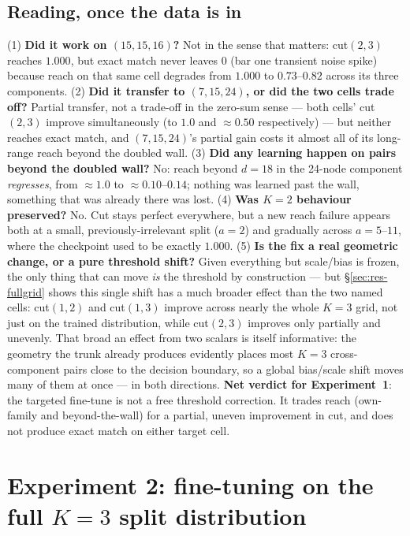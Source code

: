 \documentclass[11pt,a4paper]{article}
\begin{document}
\subsection{Reading, once the data is in}
\label{sec:verdict-a}

(1) \textbf{Did it work on $(15,15,16)$?} Not in the sense that matters: cut$(2,3)$ reaches
$1.000$, but exact match never leaves $0$ (bar one transient noise spike) because reach on
that same cell degrades from $1.000$ to $0.73$--$0.82$ across its three components. (2)
\textbf{Did it transfer to $(7,15,24)$, or did the two cells trade off?} Partial transfer, not
a trade-off in the zero-sum sense --- both cells' cut$(2,3)$ improve simultaneously (to $1.0$
and $\approx0.50$ respectively) --- but neither reaches exact match, and $(7,15,24)$'s partial
gain costs it almost all of its long-range reach beyond the doubled wall. (3) \textbf{Did any
learning happen on pairs beyond the doubled wall?} No: reach beyond $d{=}18$ in the 24-node
component \emph{regresses}, from $\approx1.0$ to $\approx0.10$--$0.14$; nothing was learned
past the wall, something that was already there was lost. (4) \textbf{Was $K{=}2$ behaviour
preserved?} No. Cut stays perfect everywhere, but a new reach failure appears both at a small,
previously-irrelevant split ($a{=}2$) and gradually across $a{=}5$--$11$, where the checkpoint
used to be exactly $1.000$. (5) \textbf{Is the fix a real geometric change, or a pure threshold
shift?} Given everything but scale/bias is frozen, the only thing that can move \emph{is} the
threshold by construction --- but \S\ref{sec:res-fullgrid} shows this single shift has a much
broader effect than the two named cells: cut$(1,2)$ and cut$(1,3)$ improve across nearly the
whole $K{=}3$ grid, not just on the trained distribution, while cut$(2,3)$ improves only
partially and unevenly. That broad an effect from two scalars is itself informative: the
geometry the trunk already produces evidently places most $K{=}3$ cross-component pairs close
to the decision boundary, so a global bias/scale shift moves many of them at once --- in both
directions. \textbf{Net verdict for Experiment~1}: the targeted fine-tune is not a free
threshold correction. It trades reach (own-family and beyond-the-wall) for a partial, uneven
improvement in cut, and does not produce exact match on either target cell.

\section{Experiment 2: fine-tuning on the full $K{=}3$ split distribution}
\label{sec:exp2}
\end{document}
